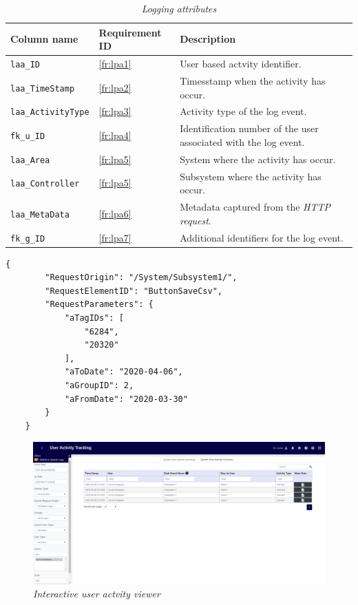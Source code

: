 \begin{table}[!htb]
	\centering
	\caption[Logging attributes]
	{\textit{Logging attributes}}
	\label{tbl:ch3_Log_Attributes}
	\begin{tabularx}{\textwidth}{|l|l|X|}
		\hline \textbf{Column name} & \textbf{Requirement ID} & \textbf{Description}\\
		\hline \texttt{laa\_ID} & \ref{fr:lpa1} & User based actvity identifier. \\
		\hline \texttt{laa\_TimeStamp} & \ref{fr:lpa2} & Timesstamp when the activity has occur. \\
		\hline \texttt{laa\_ActivityType} & \ref{fr:lpa3} & Activity type of the log event. \\
		\hline \texttt{fk\_u\_ID} & \ref{fr:lpa4} & Identification number of the user associated with the log event. \\
		\hline \texttt{laa\_Area} & \ref{fr:lpa5} & System where the activity has occur. \\
		\hline \texttt{laa\_Controller} & \ref{fr:lpa5} & Subsystem where the activity has occur. \\
		\hline \texttt{laa\_MetaData} & \ref{fr:lpa6} & Metadata captured from the \textit{HTTP request}. \\
		\hline \texttt{fk\_g\_ID} & \ref{fr:lpa7} & Additional identifiers for the log event. \\
		\hline
	\end{tabularx}
\end{table}



\begin{lstlisting}[style=json, caption={\textit{Metadata JSON}}, label={fig:ch3_MetadataJson}] 
	{
		"RequestOrigin": "/System/Subsystem1/",
		"RequestElementID": "ButtonSaveCsv",
		"RequestParameters": {
			"aTagIDs": [
				"6284",
				"20320"
			],
			"aToDate": "2020-04-06",
			"aGroupID": 2,
			"aFromDate": "2020-03-30"
		}
	}
\end{lstlisting}

\begin{landscape}
	\begin{figure}[!htb] %
		\centering %
		\includegraphics[width=0.99\linewidth]{img/ch3/analysis/UAT_menu.png}
		\caption[Interactive user actvity viewer]
		{\textit{Interactive user actvity viewer}}\label{fig:ch3_UAT_menu}
	\end{figure}
\end{landscape}

